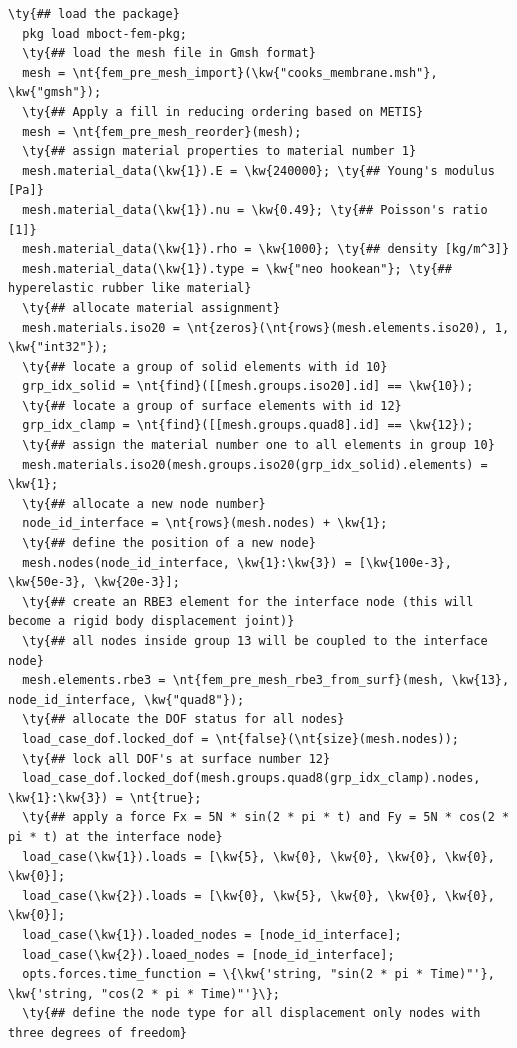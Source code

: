 \begin{Verbatim}[commandchars=\\\{\}]
  \ty{## load the package}
  pkg load mboct-fem-pkg;
  \ty{## load the mesh file in Gmsh format}
  mesh = \nt{fem_pre_mesh_import}(\kw{"cooks_membrane.msh"}, \kw{"gmsh"});
  \ty{## Apply a fill in reducing ordering based on METIS}
  mesh = \nt{fem_pre_mesh_reorder}(mesh);
  \ty{## assign material properties to material number 1}
  mesh.material_data(\kw{1}).E = \kw{240000}; \ty{## Young's modulus [Pa]}
  mesh.material_data(\kw{1}).nu = \kw{0.49}; \ty{## Poisson's ratio [1]}
  mesh.material_data(\kw{1}).rho = \kw{1000}; \ty{## density [kg/m^3]}
  mesh.material_data(\kw{1}).type = \kw{"neo hookean"}; \ty{## hyperelastic rubber like material}
  \ty{## allocate material assignment}
  mesh.materials.iso20 = \nt{zeros}(\nt{rows}(mesh.elements.iso20), 1, \kw{"int32"});
  \ty{## locate a group of solid elements with id 10}
  grp_idx_solid = \nt{find}([[mesh.groups.iso20].id] == \kw{10});
  \ty{## locate a group of surface elements with id 12}
  grp_idx_clamp = \nt{find}([[mesh.groups.quad8].id] == \kw{12});
  \ty{## assign the material number one to all elements in group 10}
  mesh.materials.iso20(mesh.groups.iso20(grp_idx_solid).elements) = \kw{1};
  \ty{## allocate a new node number}
  node_id_interface = \nt{rows}(mesh.nodes) + \kw{1};
  \ty{## define the position of a new node}
  mesh.nodes(node_id_interface, \kw{1}:\kw{3}) = [\kw{100e-3}, \kw{50e-3}, \kw{20e-3}];
  \ty{## create an RBE3 element for the interface node (this will become a rigid body displacement joint)}
  \ty{## all nodes inside group 13 will be coupled to the interface node}
  mesh.elements.rbe3 = \nt{fem_pre_mesh_rbe3_from_surf}(mesh, \kw{13}, node_id_interface, \kw{"quad8"});
  \ty{## allocate the DOF status for all nodes}
  load_case_dof.locked_dof = \nt{false}(\nt{size}(mesh.nodes));
  \ty{## lock all DOF's at surface number 12}
  load_case_dof.locked_dof(mesh.groups.quad8(grp_idx_clamp).nodes, \kw{1}:\kw{3}) = \nt{true};
  \ty{## apply a force Fx = 5N * sin(2 * pi * t) and Fy = 5N * cos(2 * pi * t) at the interface node}
  load_case(\kw{1}).loads = [\kw{5}, \kw{0}, \kw{0}, \kw{0}, \kw{0}, \kw{0}];
  load_case(\kw{2}).loads = [\kw{0}, \kw{5}, \kw{0}, \kw{0}, \kw{0}, \kw{0}];
  load_case(\kw{1}).loaded_nodes = [node_id_interface];
  load_case(\kw{2}).loaed_nodes = [node_id_interface];
  opts.forces.time_function = \{\kw{'string, "sin(2 * pi * Time)"'}, \kw{'string, "cos(2 * pi * Time)"'}\};
  \ty{## define the node type for all displacement only nodes with three degrees of freedom}

\end{Verbatim}
